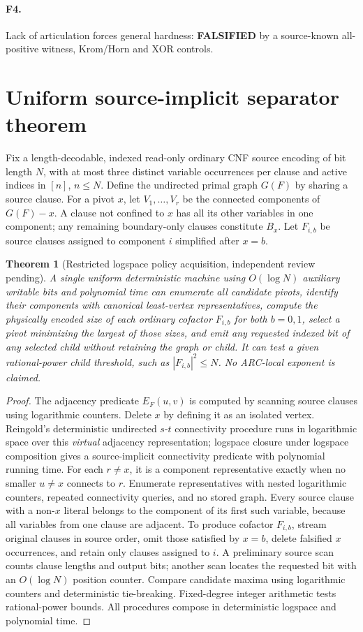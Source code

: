 \documentclass[11pt]{article}
\newtheorem{theorem}{Theorem}
\begin{document}
\paragraph{F4.} Lack of articulation forces general hardness: \textbf{FALSIFIED} by a source-known all-positive witness, Krom/Horn and XOR controls.

\section{Uniform source-implicit separator theorem}
Fix a length-decodable, indexed read-only ordinary CNF source encoding of bit length $N$, with at most three distinct variable occurrences per clause and active indices in $[n]$, $n\le N$. Define the undirected primal graph $G(F)$ by sharing a source clause. For a pivot $x$, let $V_1,\ldots,V_r$ be the connected components of $G(F)-x$. A clause not confined to $x$ has all its other variables in one component; any remaining boundary-only clauses constitute $B_x$. Let $F_{i,b}$ be source clauses assigned to component $i$ simplified after $x=b$.

\begin{theorem}[Restricted logspace policy acquisition, independent review pending]
A single uniform deterministic machine using $O(\log N)$ auxiliary writable bits and polynomial time can enumerate all candidate pivots, identify their components with canonical least-vertex representatives, compute the \emph{physically encoded} size of each ordinary cofactor $F_{i,b}$ for both $b=0,1$, select a pivot minimizing the largest of those sizes, and emit any requested indexed bit of any selected child without retaining the graph or child. It can test a given rational-power child threshold, such as $|F_{i,b}|^2\le N$. No ARC-local exponent is claimed.
\end{theorem}
\begin{proof}
The adjacency predicate $E_F(u,v)$ is computed by scanning source clauses using logarithmic counters. Delete $x$ by defining it as an isolated vertex. Reingold's deterministic undirected $s$-$t$ connectivity procedure runs in logarithmic space over this \emph{virtual} adjacency representation; logspace closure under logspace composition gives a source-implicit connectivity predicate with polynomial running time. For each $r\ne x$, it is a component representative exactly when no smaller $u\ne x$ connects to $r$. Enumerate representatives with nested logarithmic counters, repeated connectivity queries, and no stored graph. Every source clause with a non-$x$ literal belongs to the component of its first such variable, because all variables from one clause are adjacent. To produce cofactor $F_{i,b}$, stream original clauses in source order, omit those satisfied by $x=b$, delete falsified $x$ occurrences, and retain only clauses assigned to $i$. A preliminary source scan counts clause lengths and output bits; another scan locates the requested bit with an $O(\log N)$ position counter. Compare candidate maxima using logarithmic counters and deterministic tie-breaking. Fixed-degree integer arithmetic tests rational-power bounds. All procedures compose in deterministic logspace and polynomial time.
\end{proof}
\end{document}
